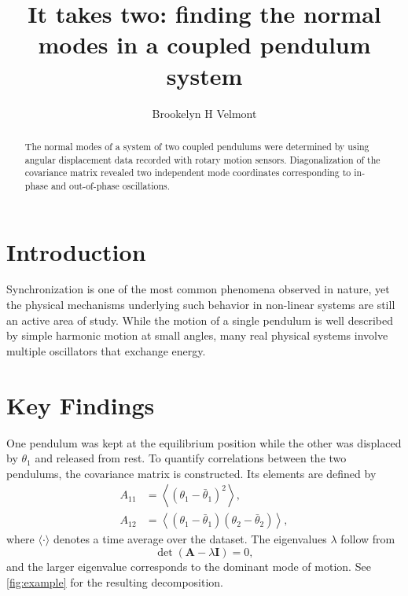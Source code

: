 \documentclass[rc,ec]{physicsinprogress}
\begin{document}
\title{It takes two: finding the normal modes in a coupled pendulum system}

\author{Brookelyn H Velmont}
%

\begin{abstract}
The normal modes of a system of two coupled pendulums were determined by using
angular displacement data recorded with rotary motion sensors. Diagonalization
of the covariance matrix revealed two independent mode coordinates
corresponding to in-phase and out-of-phase oscillations.
\end{abstract}

\maketitle

\section{Introduction}

Synchronization is one of the most common phenomena observed in nature, yet the
physical mechanisms underlying such behavior in non-linear systems are still an
active area of study. While the motion of a single pendulum is well described by
simple harmonic motion at small angles, many real physical systems involve
multiple oscillators that exchange energy.

\section{Key Findings}

One pendulum was kept at the equilibrium position while the other was displaced
by $\theta_1$ and released from rest. To quantify correlations between the two
pendulums, the covariance matrix is constructed. Its elements are defined by
\begin{align}
A_{11} &= \left\langle (\theta_1 - \bar{\theta}_1)^2 \right\rangle, \\
A_{12} &= \left\langle (\theta_1 - \bar{\theta}_1)(\theta_2 - \bar{\theta}_2) \right\rangle,
\end{align}
where $\langle \cdot \rangle$ denotes a time average over the dataset. The
eigenvalues $\lambda$ follow from
\begin{equation}
    \det(\mathbf{A} - \lambda \mathbf{I}) = 0,
\end{equation}
and the larger eigenvalue corresponds to the dominant mode of motion. See
\cref{fig:example} for the resulting decomposition.
\end{document}
